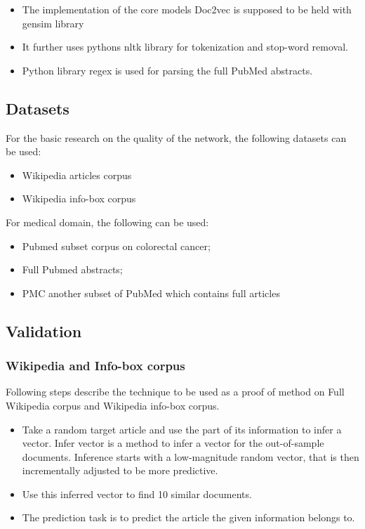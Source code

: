 \documentclass[12pt,a4paper] {article}
\begin{document}
\begin{itemize}
	\item The implementation of the core models Doc2vec is supposed to be held with gensim library \cite{rehurek_lrec}
	
	\item It further uses pythons nltk library for tokenization and stop-word removal.
	
	\item Python library regex is used for parsing the full PubMed abstracts. 
	
	
\end{itemize}


\subsection*{Datasets}
For the basic research on the quality of the network, the following datasets can 
be used:
\begin{itemize}
	\item Wikipedia articles corpus
	\item Wikipedia info-box corpus
\end{itemize}

For medical domain, the following can be used:
\begin{itemize}
	\item Pubmed subset corpus on colorectal cancer;
	\item Full Pubmed abstracts;
	\item PMC another subset of PubMed which contains full articles
\end{itemize}


\subsection*{Validation}

\subsubsection*{Wikipedia and Info-box corpus}
Following steps describe the technique to be used as a proof of method on Full Wikipedia corpus and Wikipedia info-box corpus. 

\begin{itemize}
	
	
	
	\item Take a random target article and use the part of its information to infer a vector. Infer vector is a method to infer a vector for the out-of-sample documents. Inference starts with a low-magnitude random vector, that is then incrementally adjusted to be more predictive.
	
	\item Use this inferred vector to find 10 similar documents.
	\item The prediction task is to predict the article the given information belongs to.
	
\end{itemize}
\end{document}
